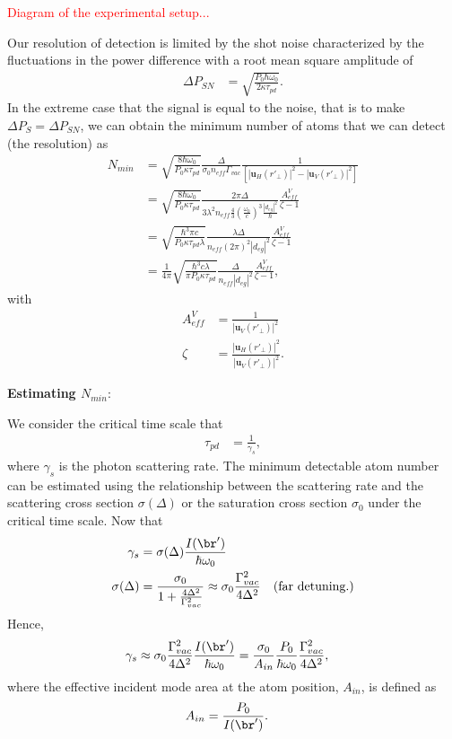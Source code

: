 \documentclass[]{report}
\begin{document}
\textcolor{red}{Diagram of the experimental setup...}

Our resolution of detection is limited by the shot noise characterized by the fluctuations in the power difference with a root mean square amplitude of 
\begin{align}
\Delta P_{SN} &= \sqrt{\frac{P_0 \hbar \omega_0 }{2\kappa \tau_{pd}}}. \label{eq:shotnoise}
\end{align}
In the extreme case that the signal is equal to the noise, that is to make $ \Delta P_S=\Delta P_{SN} $, we can obtain the minimum number of atoms that we can detect (the resolution) as
\begin{align}
N_{min} &= \sqrt{\frac{8  \hbar \omega_0  }{P_0\kappa \tau_{pd}}}\frac{\Delta}{\sigma_0 n_{e\!f\!f}\Gamma_{vac}}\frac{1}{\left[| \mathbf{u}_H(r'_{\!\perp})|^2- | \mathbf{u}_V(r'_{\!\perp})|^2 \right]}\\
&=\sqrt{\frac{8  \hbar \omega_0  }{P_0\kappa \tau_{pd}}}\frac{2\pi\Delta}{3\lambda^2 n_{e\!f\!f}\frac{4}{3} \left( \frac{\omega_0}{c}\right)^3 \frac{|d_{eg}|^2}{\hbar}}\frac{A_{e\!f\!f}^V}{\zeta -1 }\\
&= \sqrt{\frac{\hbar^3 \pi c  }{P_0\kappa \tau_{pd}\lambda}}\frac{\lambda\Delta }{ n_{e\!f\!f} \left( 2\pi\right)^2 |d_{eg}|^2}\frac{A_{e\!f\!f}^V}{\zeta -1 }\\
&= \frac{1}{4\pi}\sqrt{\frac{\hbar^3 c \lambda }{\pi P_0\kappa \tau_{pd}}}\frac{\Delta }{ n_{e\!f\!f}  |d_{eg}|^2}\frac{A_{e\!f\!f}^V}{\zeta -1 },
\end{align}
with
\begin{align}
A_{e\!f\!f}^V &= \frac{1}{| \mathbf{u}_V(r'_{\!\perp})|^2}\\
\zeta &= \frac{| \mathbf{u}_H(r'_{\!\perp})|^2}{| \mathbf{u}_V(r'_{\!\perp})|^2}.
\end{align}

\textbf{Estimating $ N_{min} $}:

We consider the critical time scale that 
\begin{align}
\tau_{pd} &= \frac{1}{\gamma_s},
\end{align}
where $ \gamma_{s} $ is the photon scattering rate. The minimum detectable atom number can be estimated using the relationship between the scattering rate and the scattering cross section $ \sigma(\Delta) $ or the saturation cross section $ \sigma_0 $ under the critical time scale. Now that
\begin{align}
\gamma_s &= \sigma(\Delta) \frac{I(\br')}{\hbar \omega_0} \\
\sigma(\Delta) &=\frac{\sigma_0}{1+\frac{4\Delta^2}{\Gamma^2_{vac}}}\approx \sigma_0 \frac{\Gamma_{vac}^2}{4\Delta^2} \quad \text{(far detuning.)}
\end{align}
Hence,
\begin{align}
\gamma_s &\approx \sigma_0\frac{\Gamma_{vac}^2}{4\Delta^2} \frac{I(\br')}{\hbar \omega_0}=\frac{\sigma_0}{A_{in}}\frac{P_0}{\hbar\omega_0}\frac{\Gamma_{vac}^2}{4\Delta^2},
\end{align}
where the effective incident mode area at the atom position, $A_{in}  $, is defined as
\begin{align}
A_{in }&= \frac{P_0}{I(\br')}.
\end{align}
\end{document}
